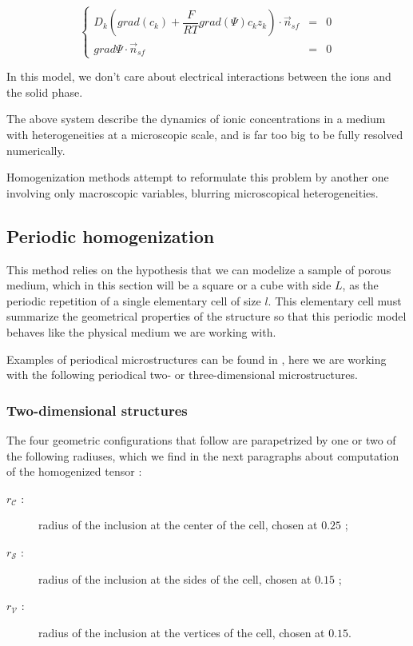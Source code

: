 \begin{equation}\label{npp_sf}
\left\{%
\begin{array}{lcr}
D_k\left(grad(c_k)+\dfrac{F}{RT}grad(\Psi)c_k z_k\right)\cdot \vec{n}_{sf}&=&0\\
grad \Psi\cdot \vec{n}_{sf}&=&0
\end{array}
\right.
\end{equation}

In this model, we don't care about electrical interactions between the ions and the solid phase.

\ligneinter
The above system describe the dynamics of ionic concentrations in a medium with heterogeneities at a microscopic scale, %
and is far too big to be fully resolved numerically.

\par
Homogenization methods attempt to reformulate this problem by another one involving only macroscopic variables, %
\og{} blurring \fg{} microscopical heterogeneities.

\subsection{Periodic homogenization}

This method relies on the hypothesis that we can modelize a sample of porous medium, %
which in this section will be a square or a cube with side $L$, %
as the periodic repetition of a single elementary cell of size $l$. %
This elementary cell must summarize the geometrical properties of the structure so that this periodic model behaves like the physical medium we are working with.

\par
Examples of periodical microstructures can be found in \cite{WalMill16}, here we are working with the following periodical two- or three-dimensional microstructures.

\subsubsection{Two-dimensional structures}

The four geometric configurations that follow are parapetrized by one or two of the following radiuses, %
which we find in the next paragraphs about computation  of the homogenized tensor :

\begin{description}
\item [$r_{\mathcal{C}}$ :] radius of the inclusion at the center of the cell, chosen at $0.25$ ;
\item [$r_{\mathcal{S}}$ :] radius of the inclusion at the sides of the cell, chosen at $0.15$ ;
\item [$r_{\mathcal{V}}$ :] radius of the inclusion at the vertices of the cell, chosen at $0.15$.
\end{description}

